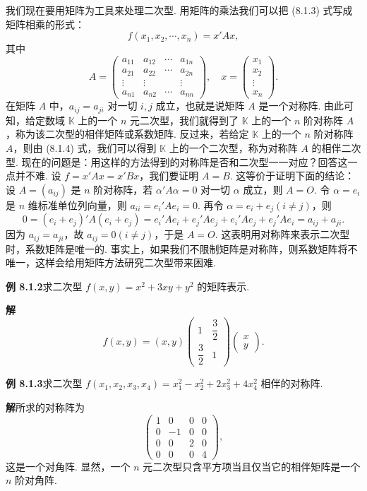 \documentclass[UTF8, 12pt, fontset=fandol, oneside]{ctexart}
\begin{document}
我们现在要用矩阵为工具来处理二次型. 用矩阵的乘法我们可以把 (8.1.3) 式写成矩阵相乘的形式：
\begin{equation}
f(x_1,x_2,\cdots,x_n)=x' Ax,
\tag{8.1.4}
\end{equation}
其中
\[
A=\left(\begin{array}{cccc}
a_{11}&a_{12}&\cdots&a_{1n}\\
a_{21}&a_{22}&\cdots&a_{2n}\\
\vdots&\vdots&&\vdots\\
a_{n1}&a_{n2}&\cdots&a_{nn}
\end{array}\right),\quad
x=\left(\begin{array}{c}
x_1\\
x_2\\
\vdots\\
x_n
\end{array}\right).
\]
在矩阵 $A$ 中，$a_{ij}=a_{ji}$ 对一切 $i,j$ 成立，也就是说矩阵 $A$ 是一个对称阵. 由此可知，给定数域 $\mathbb K$ 上的一个 $n$ 元二次型，我们就得到了 $\mathbb K$ 上的一个 $n$ 阶对称阵 $A$，称为该二次型的相伴矩阵或系数矩阵. 反过来，若给定 $\mathbb K$ 上的一个 $n$ 阶对称阵 $A$，则由 (8.1.4) 式，我们可以得到 $\mathbb K$ 上的一个二次型，称为对称阵 $A$ 的相伴二次型. 现在的问题是：用这样的方法得到的对称阵是否和二次型一一对应？回答这一点并不难. 设 $f=x'Ax=x'Bx$，我们要证明 $A=B$. 这等价于证明下面的结论：设 $A=(a_{ij})$ 是 $n$ 阶对称阵，若 $\alpha'A\alpha=0$ 对一切 $\alpha$ 成立，则 $A=O$. 令 $\alpha=e_i$ 是 $n$ 维标准单位列向量，则 $a_{ii}=e_i'Ae_i=0$. 再令 $\alpha=e_i+e_j(i\neq j)$，则
\[
0=(e_i+e_j)'A(e_i+e_j)=e_i'Ae_i+e_j'Ae_j+e_i'Ae_j+e_j'Ae_i=a_{ij}+a_{ji}.
\]
因为 $a_{ij}=a_{ji}$，故 $a_{ij}=0(i\neq j)$，于是 $A=O$. 这表明用对称阵来表示二次型时，系数矩阵是唯一的. 事实上，如果我们不限制矩阵是对称阵，则系数矩阵将不唯一，这样会给用矩阵方法研究二次型带来困难.

\noindent\textbf{例 8.1.2}\quad 求二次型 $f(x,y)=x^2+3xy+y^2$ 的矩阵表示.

\noindent\textbf{解}\quad
\[
f(x,y)=(x,y)\left(\begin{array}{cc}
1&\dfrac32\\
\dfrac32&1
\end{array}\right)
\left(\begin{array}{c}
x\\
y
\end{array}\right).
\]

\noindent\textbf{例 8.1.3}\quad 求二次型 $f(x_1,x_2,x_3,x_4)=x_1^2-x_2^2+2x_3^2+4x_4^2$ 相伴的对称阵.

\noindent\textbf{解}\quad 所求的对称阵为
\[
\left(\begin{array}{cccc}
1&0&0&0\\
0&-1&0&0\\
0&0&2&0\\
0&0&0&4
\end{array}\right),
\]
这是一个对角阵. 显然，一个 $n$ 元二次型只含平方项当且仅当它的相伴矩阵是一个 $n$ 阶对角阵.
\end{document}

